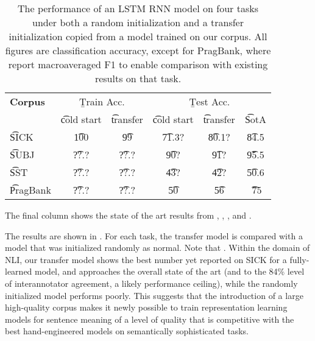 \noindent{}


\begin{table}
\begin{center}
\begin{tabular}{l@{\hskip \colspaceL}c@{\hskip \colspaceS}c@{\hskip \colspaceS}c@{\hskip \colspaceS}c@{\hskip \colspaceS}c}
\hline
\textbf{Corpus} & \multicolumn{2}{c}{\b{Train Acc.}} &\multicolumn{3}{c}{ \b{Test Acc.}} \\
 & \t{cold start} & \t{transfer} & \t{cold start} & \t{transfer} & \t{SotA} \\
\hline
\t{SICK}            & \t{100} & \t{99} & \t{71.3?} & \t{80.1?} & \t{84.5} \\
\t{SUBJ}          & \t{??.?} & \t{??.?} & \t{90?} & \t{91?}& \t{95.5} \\
\t{SST}          & \t{??.?} & \t{??.?} & \t{43?} & \t{42?} & \t{50.6}\\
\t{PragBank}          & \t{??.?} & \t{??.?} & \t{50} & \t{56}& \t{~75} \\
\hline
\end{tabular}
\end{center}

\caption{\label{tab:transferresults}
The performance of an LSTM RNN model on four tasks under both a random initialization and a transfer initialization copied from a model trained on our corpus. All figures are classification accuracy, except for PragBank, where report macroaveraged F1 to enable comparison with existing results on that task. } 

\end{table}

The final column shows the state of the art results from \citealt{lai2014illinois}, \citealt{zhao2015self}, \citealt{tai2015improved}, and .

The results are shown in . For each task, the transfer model is compared with a model that was initialized randomly as normal. Note that . Within the domain of NLI, our transfer model shows the best number yet reported on SICK for a fully-learned model, and approaches the overall state of the art (and to the 84\% level of interannotator agreement, a likely performance ceiling), while the randomly initialized model performs poorly. This suggests that the introduction of a large high-quality corpus makes it newly possible to train representation learning models for sentence meaning of a level of quality that is competitive with the best hand-engineered models on semantically sophisticated tasks.

\noindent{}